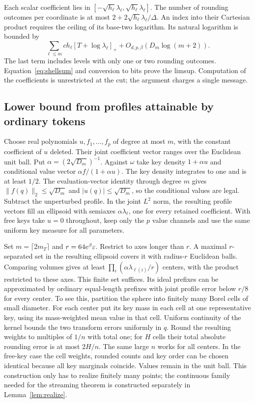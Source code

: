 Each scalar coefficient lies in $[-\sqrt{h_\ell}\lambda_\ell,\sqrt{h_\ell}\lambda_\ell]$. The number of rounding outcomes per coordinate is at most $2+2\sqrt{h_\ell}\lambda_\ell/\Delta$. An index into their Cartesian product requires the ceiling of its base-two logarithm. Its natural logarithm is bounded by
\[
 \sum_{\ell\le m} c h_\ell [T+\log\lambda_\ell]_+ + O_{d,p,\beta}(D_m\log(m+2)).
\]
The last term includes levels with only one or two rounding outcomes. Equation~\eqref{eq:shellsum} and conversion to bits prove the limsup. Computation of the coefficients is unrestricted at the cut; the argument charges a single message.

\subsection{Lower bound from profiles attainable by ordinary tokens}
Choose real polynomials $u,f_1,\ldots,f_p$ of degree at most $m$, with the constant coefficient of $u$ deleted. Their joint coefficient vector ranges over the Euclidean unit ball. Put $\alpha=(2\sqrt{D_m})^{-1}$. Against $\omega$ take key density $1+\alpha u$ and conditional value vector $\alpha f/(1+\alpha u)$. The key density integrates to one and is at least $1/2$. The evaluation-vector identity through degree $m$ gives $\|f(q)\|_2\le\sqrt{D_m}$ and $|u(q)|\le\sqrt{D_m}$, so the conditional values are legal. Subtract the unperturbed profile. In the joint $L^2$ norm, the resulting profile vectors fill an ellipsoid with semiaxes $\alpha\lambda_\ell$, one for every retained coefficient. With free keys take $u=0$ throughout, keep only the $p$ value channels and use the same uniform key measure for all parameters.

Set $m=\lceil2m_T\rceil$ and $r=64 e^\beta\varepsilon$. Restrict to axes longer than $r$. A maximal $r$-separated set in the resulting ellipsoid covers it with radius-$r$ Euclidean balls. Comparing volumes gives at least $\prod_i (\alpha\lambda_{\ell(i)}/r)$ centers, with the product restricted to these axes. This finite set suffices. Its ideal prefixes can be approximated by ordinary equal-length prefixes with joint profile error below $r/8$ for every center. To see this, partition the sphere into finitely many Borel cells of small diameter. For each center put its key mass in each cell at one representative key, using its mass-weighted mean value in that cell. Uniform continuity of the kernel bounds the two transform errors uniformly in $q$. Round the resulting weights to multiples of $1/n$ with total one; for $H$ cells their total absolute rounding error is at most $2H/n$. The same large $n$ works for all centers. In the free-key case the cell weights, rounded counts and key order can be chosen identical because all key marginals coincide. Values remain in the unit ball. This construction only has to realize finitely many points; the continuous family needed for the streaming theorem is constructed separately in Lemma~\ref{lem:realize}.


